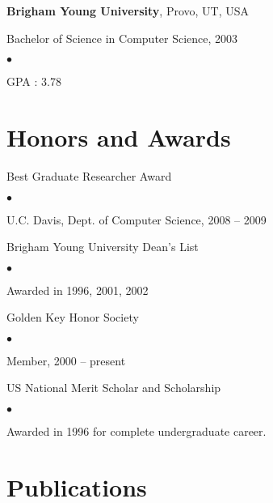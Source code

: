 \documentclass[margin,line,article]{res}
\newenvironment{list1}{
  \begin{list}{}{%
      \setlength{\itemsep}{0in}
      \setlength{\parsep}{0in} \setlength{\parskip}{0in}
      \setlength{\topsep}{0in} \setlength{\partopsep}{0in} 
      \setlength{\leftmargin}{0.17in}}}{\end{list}}
\newenvironment{list2}{
  \begin{list}{$\bullet$}{%
      \setlength{\itemsep}{0in}
      \setlength{\parsep}{0in} \setlength{\parskip}{0in}
      \setlength{\topsep}{0in} \setlength{\partopsep}{0in} 
      \setlength{\leftmargin}{0.2in}}}{\end{list}}
\begin{document}
\begin{resume}
\textbf{Brigham Young University}, Provo, UT, USA
\begin{list1}
\item Bachelor of Science in Computer Science, 2003
\begin{list2}
\vspace*{.05in}
\item GPA : 3.78
\end{list2}
\end{list1}


\section{Honors and Awards} 

Best Graduate Researcher Award
\begin{list2}
\item U.C. Davis, Dept. of Computer Science, 2008 -- 2009
\end{list2}

Brigham Young University Dean's List
\begin{list2}
\item Awarded in 1996, 2001, 2002
\end{list2}

Golden Key Honor Society
\begin{list2}
\item Member, 2000 -- present
\end{list2}

US National Merit Scholar and Scholarship
\begin{list2}
\item Awarded in 1996 for complete undergraduate career.
\end{list2}

\section{Publications}











\end{resume}
\end{document}
